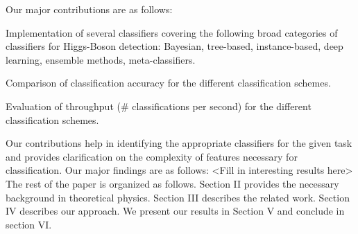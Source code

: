 Our major contributions are as follows:
\begin{enum}
\item	Implementation of several classifiers covering the following broad categories of classifiers for Higgs-Boson detection: Bayesian, tree-based, instance-based, deep learning, ensemble methods, meta-classifiers.
\item	Comparison of classification accuracy for the different classification schemes.
\item	Evaluation of throughput (# classifications per second) for the different classification schemes.
\end{enum}
Our contributions help in identifying the appropriate classifiers for the given task and provides clarification on the complexity of features necessary for classification.
Our major findings are as follows: <Fill in interesting results here>
The rest of the paper is organized as follows. Section II provides the necessary background in theoretical physics. Section III describes the related work. Section IV describes our approach. We present our results in Section V and conclude in section VI.

